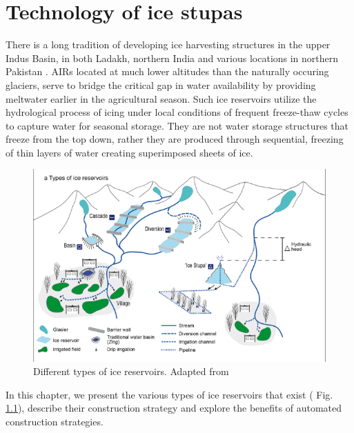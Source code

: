 \chapter{Technology of ice stupas}
\label{chap:tech}


There is a long tradition of developing ice harvesting structures in the upper Indus Basin, in both Ladakh,
northern India \citep{labbalTraditionalOasesLadakh2000, nusserIrrigationDevelopmentUpper2012} and various
locations in northern Pakistan \citep{kreutzmannScarcityOpulenceWater2011}. AIRs located at much lower altitudes
than the naturally occuring glaciers, serve to bridge the critical gap in water availability by providing
meltwater earlier in the agricultural season. Such ice reservoirs utilize the hydrological process of icing
under local conditions of frequent freeze-thaw cycles to capture water for seasonal storage. They are not water
storage structures that freeze from the top down, rather they are produced through sequential, freezing of thin
layers of water creating superimposed sheets of ice.

\begin{figure}[htb]
\centering
\includegraphics[width=\textwidth]{figs/AIR_designs}
\caption{Different types of ice reservoirs. Adapted from \cite{nusserSociohydrologyArtificialGlaciers2019}}
\label{fig:AIRdesigns}
\end{figure}

In this chapter, we present the various types of ice reservoirs that exist ( Fig. \ref{fig:AIRdesigns}),
describe their construction strategy and explore the benefits of automated construction strategies.


